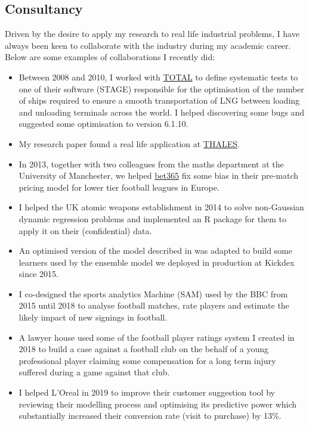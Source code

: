 \documentclass[11pt]{article}
\begin{document}
\subsection{Consultancy}
\label{sec:org81fef6a}
Driven by the desire to apply my research to real life industrial problems, I
have always been keen to collaborate with the industry during my academic
career. Below are some examples of collaborations I recently did:

\begin{itemize}
\item Between 2008 and 2010, I worked with \href{https://www.total.com/en/group/identity}{TOTAL} to define systematic tests to
one of their software (STAGE) responsible for the optimisation of the
number of ships required to ensure a smooth transportation of LNG between
loading and unloading terminals across the world. I helped discovering some
bugs and suggested some optimisation to version 6.1.10.
\item My research paper \cite{heil2012quasi} found a real life application at
\href{https://www.thalesgroup.com/en}{THALES}.
\item In 2013, together with two colleagues from the maths department at the
University of Manchester, we helped \href{https://www.bet365.com/\#/HO/}{bet365} fix some bias in their pre-match
pricing model for lower tier football leagues in Europe.
\item I helped the UK atomic weapons establishment in 2014 to solve non-Gaussian
dynamic regression problems and implemented an R package for them to apply
it on their (confidential) data.
\item An optimised version of the model described in \cite{boshnakov2017bivariate}
was adapted to build some learners used by the ensemble model we deployed
in production at Kickdex since 2015.
\item I co-designed the sports analytics Machine (SAM) used by the BBC from 2015
until 2018 to analyse football matches, rate players and estimate the
likely impact of new signings in football.
\item A lawyer house used some of the football player ratings system I created
\cite{kharrat20deep,kharrat2019plus} in 2018 to build a case against a
football club on the behalf of a young professional player claiming some
compensation for a long term injury suffered during a game against that
club.
\item I helped L'Oreal in 2019 to improve their customer suggestion tool by
reviewing their modelling process and optimising its predictive power which
substantially increased their conversion rate (visit to purchase) by 13\%.
\end{itemize}
\end{document}
